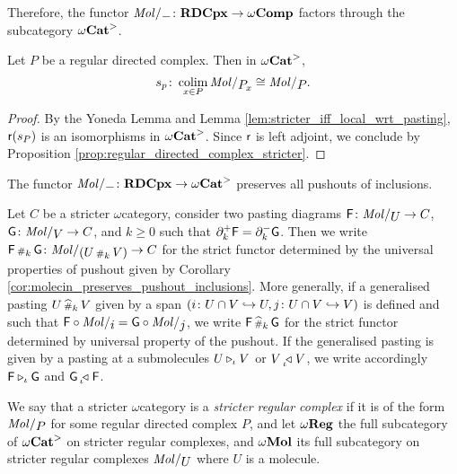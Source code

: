 \noindent Therefore, the functor \( \molecin{-} \colon \rdcpx \to \Comp \) factors through the subcategory \( {\omega\mathbf{Cat}}^> \).

\begin{cor} \label{cor:regular_directed_complex_colimit_of_itself}
    Let \( P \) be a regular directed complex.
    Then in \( {\omega\mathbf{Cat}}^> \),
    \begin{equation*}
        s_p \colon \colim_{x \in P} \molecin{\imel{P}{x}} \cong \molecin{P}.
    \end{equation*}
\end{cor}
\begin{proof}
    By the Yoneda Lemma and Lemma \ref{lem:stricter_iff_local_wrt_pasting}, \( \mathsf{r}(s_P) \) is an isomorphisms in \( {\omega\mathbf{Cat}}^> \).
    Since \( \mathsf{r} \) is left adjoint, we conclude by Proposition \ref{prop:regular_directed_complex_stricter}.
\end{proof}

\begin{cor} \label{cor:molecin_preserves_pushout_inclusions}
    The functor \( \molecin{-} \colon \rdcpx \to \somegaCat \) preserves all pushouts of inclusions. 
\end{cor}

\begin{dfn} 
    Let \( C \) be a stricter \( \omega \)\nbd category, consider two pasting diagrams \( \F \colon \molecin{U} \to C \), \( \G \colon \molecin{V} \to C \), and \( k \geq 0 \) such that \( \partial_{k}^{+} \mathsf{F} = \partial_{k}^{-} \mathsf{G} \).
    Then we write \( \F \cp{k} \G \colon \molecin{(U \cp{k} V)} \to C \) for the strict functor determined by the universal properties of pushout given by Corollary \ref{cor:molecin_preserves_pushout_inclusions}.
    More generally, if a generalised pasting \( U \,{\scriptstyle\widehat{\#}}_{k}\, V \) given by a span \( (i \colon U \cap V \hookrightarrow U, j \colon U \cap V \hookrightarrow V) \) is defined and such that \( \F \after \molecin{i} = \G \after \molecin{j} \), we write \( \mathsf{F} \,{\scriptstyle\widehat{\#}}_{k}\, \mathsf{G} \) for the strict functor determined by universal property of the pushout.
    If the generalised pasting is given by a pasting at a submolecules \( U \triangleright_{\iota} V \) or \( V \prescript{}{\iota\!}{\triangleleft}\; V \), we write accordingly \( \mathsf{F} \triangleright_{\iota} \mathsf{G} \) and \( \mathsf{G} \prescript{}{\iota\!}{\triangleleft}\; \mathsf{F} \).
\end{dfn}

\begin{dfn} 
    We say that a stricter \( \omega \)\nbd category is a \emph{stricter regular complex} if it is of the form \( \molecin{P} \) for some regular directed complex \( P \), and let \( \omega\mathbf{Reg} \) the full subcategory of \( {\omega\mathbf{Cat}}^> \) on stricter regular complexes, and \( \omega\mathbf{Mol} \) its full subcategory on stricter regular complexes \( \molecin{U} \) where \( U \) is a molecule.
\end{dfn}

